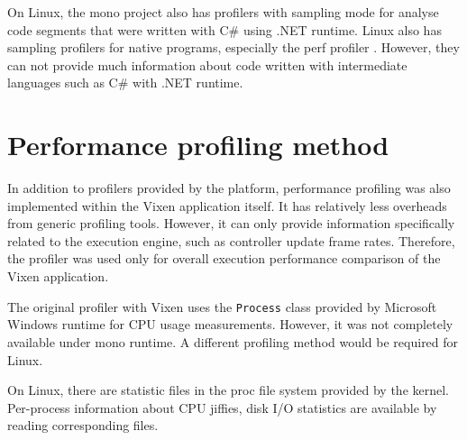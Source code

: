 On Linux, the mono project also has profilers with sampling mode for analyse code segments that were written with C\# using .NET runtime. Linux also has sampling profilers for native programs, especially the perf profiler \cite{de2010new}. However, they can not provide much information about code written with intermediate languages such as C\# with .NET runtime.

\section{Performance profiling method}

In addition to profilers provided by the platform, performance profiling was also implemented within the Vixen application itself. It has relatively less overheads from generic profiling tools. However, it can only provide information specifically related to the execution engine, such as controller update frame rates. Therefore, the profiler was used only for overall execution performance comparison of the Vixen application.

The original profiler with Vixen uses the \texttt{Process} class provided by Microsoft Windows runtime for CPU usage measurements. However, it was not completely available under mono runtime. A different profiling method would be required for Linux.

On Linux, there are statistic files in the proc file system \cite{proc} provided by the kernel. Per-process information about CPU jiffies, disk I/O statistics are available by reading corresponding files.

